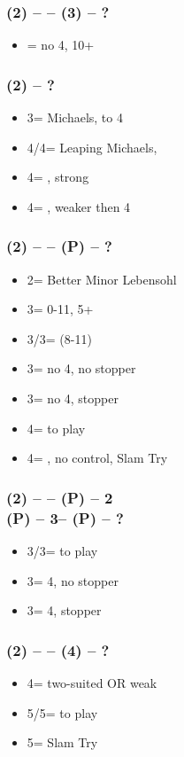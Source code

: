 \documentclass[12pt, a4paper]{article}
\begin{document}
\subsubsection*{(2\hearts) -- \dbl -- (3\hearts) -- ?}
\begin{itemize}
    \item \dbl = no 4\spades, 10+
\end{itemize}

\subsubsection*{(2\spades) -- ?}
\begin{itemize}
    \item 3\spades = Michaels, \ftwon to 4
    \item 4\clubs/4\diams = Leaping Michaels, \gf
    \item 4\spades = \minor, strong
    \item 4\nt = \minor, weaker then 4\hearts
\end{itemize}

\subsubsection*{(2\spades) -- \dbl -- (P) -- ?}
\begin{itemize}
    \item 2\nt = Better Minor Lebensohl
    \item 3\clubs = 0-11, 5+\clubs
    \item 3\diams/3\hearts = \inv (8-11)
    \item 3\spades = no 4\hearts, no \spades stopper
    \item 3\nt = no 4\hearts, \spades stopper
    \item 4\hearts = to play
    \item 4\hearts = \minor, no \spades control, Slam Try
\end{itemize}

\subsubsection*{(2\spades) -- \dbl -- (P) -- 2\nt \\
                (P) -- 3\mins -- (P) -- ?}
\begin{itemize}
    \item 3\hearts/3\diams = to play
    \item 3\spades = 4\hearts, no \spades stopper
    \item 3\nt = 4\hearts, \spades stopper
\end{itemize}

\subsubsection*{(2\spades) -- \dbl -- (4\spades) -- ?}
\begin{itemize}
    \item 4\nt = two-suited OR weak \hearts
    \item 5\clubs/5\diams = to play
    \item 5\hearts = Slam Try
\end{itemize}

\end{document}
